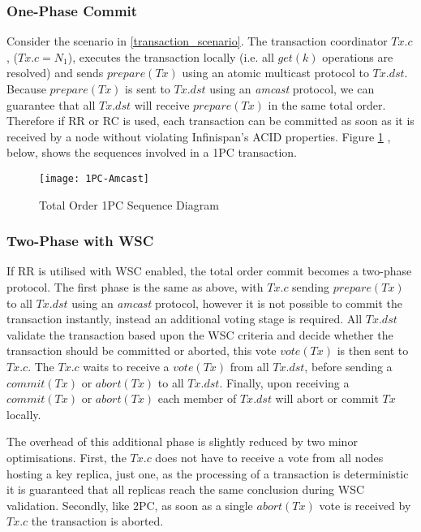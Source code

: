 	        \subsubsection*{One-Phase Commit}
	        Consider the scenario in \ref{transaction_scenario}.  The transaction coordinator $Tx.c$, ($Tx.c = N_1$), executes the transaction locally (i.e. all $get(k)$ operations are resolved) and sends $prepare(Tx)$ using an atomic multicast protocol to $Tx.dst$.  Because $prepare(Tx)$ is sent to $Tx.dst$ using an \emph{amcast} protocol, we can guarantee that all $Tx.dst$ will receive $prepare(Tx)$ in the same total order.  Therefore if RR or RC is used, each transaction can be committed as soon as it is received by a node without violating Infinispan's ACID properties.  Figure \ref{fig:total_order_1PC} , below, shows the sequences involved in a 1PC transaction.  
	        
            \begin{figure}[htbp!] 
                \centering    
                \texttt{[image: 1PC-Amcast]}
                \caption[Total Order One-phase Commit Protocol]{Total Order 1PC Sequence Diagram}
                \label{fig:total_order_1PC}
            \end{figure}	        
	        
		        
			\subsubsection*{Two-Phase with WSC}      
	        If RR is utilised with WSC enabled, the total order commit becomes a two-phase protocol.  The first phase is the same as above, with $Tx.c$ sending $prepare(Tx)$ to all $Tx.dst$ using an \emph{amcast} protocol, however it is not possible to commit the transaction instantly, instead an additional voting stage is required.  All $Tx.dst$ validate the transaction based upon the WSC criteria and decide whether the transaction should be committed or aborted, this vote $vote(Tx)$ is then sent to $Tx.c$.  The $Tx.c$ waits to receive a $vote(Tx)$ from all $Tx.dst$, before sending a $commit(Tx)$ or $abort(Tx)$ to all $Tx.dst$.  Finally, upon receiving a $commit(Tx)$ or $abort(Tx)$ each member of $Tx.dst$ will abort or commit $Tx$ locally.          
	        
			The overhead of this additional phase is slightly reduced by two minor optimisations.  First, the $Tx.c$ does not have to receive a vote from all nodes hosting a key replica, just one, as the processing of a transaction is deterministic it is guaranteed that all replicas reach the same conclusion during WSC validation.  Secondly, like 2PC, as soon as a single $abort(Tx)$ vote is received by $Tx.c$ the transaction is aborted.  
			
